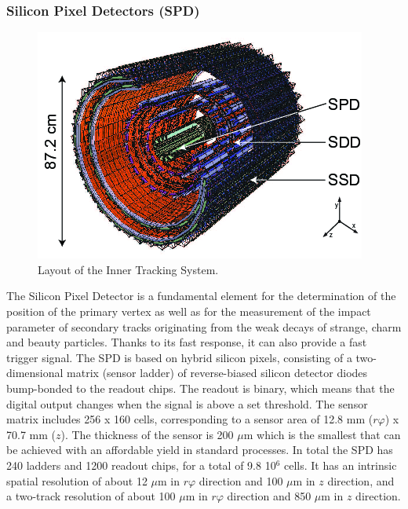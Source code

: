 \documentclass[b5paper,10pt,twoside,oldstyle,classica]{toptesi}
\begin{document}
\subsubsection{Silicon Pixel Detectors (SPD)}
\begin{figure}[tb]
\begin{center}
\includegraphics[scale = 0.5]{its.png}
\caption{Layout of the Inner Tracking System.}
\label{ITS}
\end{center}
\end{figure}
The Silicon Pixel Detector is a fundamental element for the determination of the position of the primary vertex as well as for the measurement of the impact parameter of secondary tracks originating from the weak decays of strange, charm and beauty particles. Thanks to its fast response, it can also provide a fast trigger signal.
The SPD is based on hybrid silicon pixels, consisting of a two-dimensional matrix (sensor ladder) of reverse-biased silicon detector diodes bump-bonded to the readout chips. The readout is binary, which means that the digital output changes when the signal is above a set threshold.
The sensor matrix includes 256 x 160 cells, corresponding to a sensor area of 12.8 mm ($r\varphi$) x 70.7 mm ($z$). 
The thickness of the sensor is 200 $\mu$m which is the smallest that can be achieved with an affordable yield in standard processes.
In total the SPD has 240 ladders and 1200 readout chips, for a total of 9.8 10$^6$ cells. It has an intrinsic spatial resolution of about 12 $\mu$m in $r\varphi$ direction and 100 $\mu$m in $z$ direction, and a two-track resolution of about 100 $\mu$m in $r\varphi$ direction and 850 $\mu$m in $z$ direction. 
\end{document}
